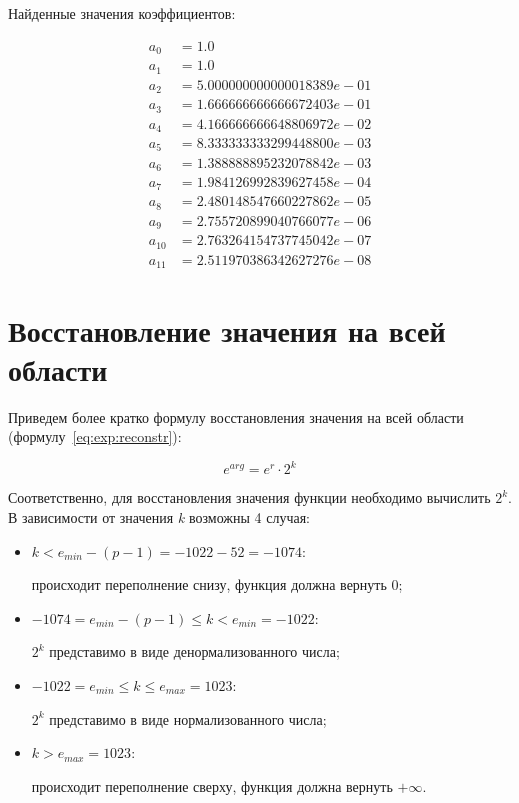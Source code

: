 Найденные значения коэффициентов:

\begin{align*}
a_{0} &= 1.0\\
a_{1} &= 1.0\\
a_{2} &= 5.000000000000018389e-01\\
a_{3} &= 1.666666666666672403e-01\\
a_{4} &= 4.166666666648806972e-02\\
a_{5} &= 8.333333333299448800e-03\\
a_{6} &= 1.388888895232078842e-03\\
a_{7} &= 1.984126992839627458e-04\\
a_{8} &= 2.480148547660227862e-05\\
a_{9} &= 2.755720899040766077e-06\\
a_{10} &= 2.763264154737745042e-07\\
a_{11} &= 2.511970386342627276e-08
\end{align*}

\section{Восстановление значения на всей области}

Приведем более кратко формулу восстановления значения на всей области (формулу~\ref{eq:exp:reconstr}):

\begin{equation}
    e^{arg}  = e^{r} \cdot 2^{k}
    \label{eq:exp:reconstr}
\end{equation}

Соответственно, для восстановления значения функции необходимо вычислить $2^k$.
В зависимости от значения \textit{k} возможны 4 случая:

\begin{itemize}
    \item $k < e_{min} - (p - 1) = -1022 - 52 = -1074$:
    
    происходит переполнение снизу, функция должна вернуть 0;
    \item $-1074 = e_{min} - (p - 1) \leq k < e_{min} = -1022$:
    
    $2^k$ представимо в виде денормализованного числа;
    \item $-1022 = e_{min} \leq k \leq e_{max} = 1023$:
    
    $2^k$ представимо в виде нормализованного числа;
    \item $k > e_{max} = 1023$:
    
    происходит переполнение сверху, функция должна вернуть $+\infty$.
\end{itemize}

